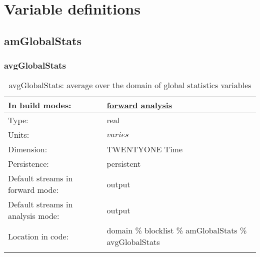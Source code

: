 \chapter[Variable definitions]{Variable definitions}
\label{chap:variable_sections}
\section[amGlobalStats]{amGlobalStats}
\label{sec:var_sec_amGlobalStats}
\subsection[avgGlobalStats]{avgGlobalStats}
\label{subsec:var_sec_amGlobalStats_avgGlobalStats}
\begin{center}
\begin{longtable}{| p{2.0in} | p{4.0in} |}
        \hline 
        In build modes: & \hyperref[subsec:forward_var_tab_amGlobalStats]{forward} \hyperref[subsec:analysis_var_tab_amGlobalStats]{analysis} \\
        \hline 
        Type: & real \\
        \hline 
        Units: & $varies$ \\
        \hline 
        Dimension: & TWENTYONE Time \\
        \hline 
        Persistence: & persistent \\
        \hline 
		 Default streams in forward mode: &  output \\
        \hline 
		 Default streams in analysis mode: &  output \\
        \hline 
		 Location in code: & domain \% blocklist \% amGlobalStats \% avgGlobalStats \\
		 \hline 
    \caption{avgGlobalStats: average over the domain of global statistics variables}
\end{longtable}
\end{center}
